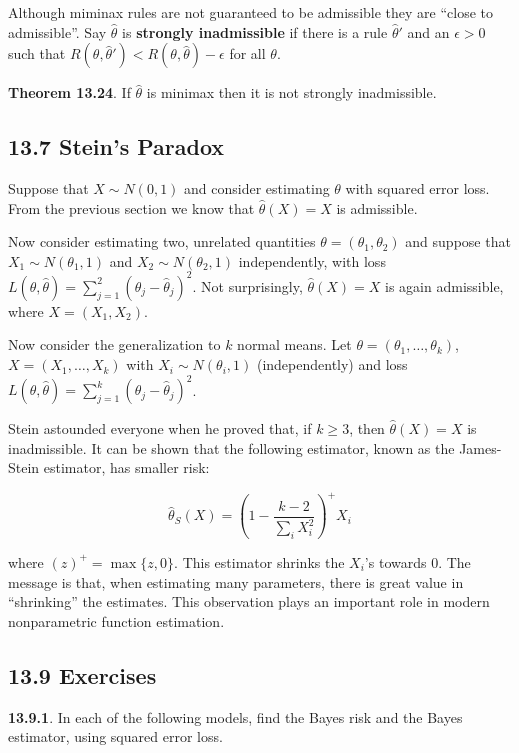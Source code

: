 Although miminax rules are not guaranteed to be admissible they are
``close to admissible''. Say \(\hat{\theta}\) is \textbf{strongly
inadmissible} if there is a rule \(\hat{\theta}'\) and an
\(\epsilon > 0\) such that
\(R(\theta, \hat{\theta}') < R(\theta, \hat{\theta}) - \epsilon\) for
all \(\theta\).

\textbf{Theorem 13.24}. If \(\hat{\theta}\) is minimax then it is not
strongly inadmissible.

\subsection{13.7 Stein's Paradox}\label{steins-paradox}

Suppose that \(X \sim N(0, 1)\) and consider estimating \(\theta\) with
squared error loss. From the previous section we know that
\(\hat{\theta}(X) = X\) is admissible.

Now consider estimating two, unrelated quantities
\(\theta = (\theta_1, \theta_2)\) and suppose that
\(X_1 \sim N(\theta_1, 1)\) and \(X_2 \sim N(\theta_2, 1)\)
independently, with loss
\(L(\theta, \hat{\theta}) = \sum_{j=1}^2 (\theta_j - \hat{\theta}_j)^2\).
Not surprisingly, \(\hat{\theta}(X) = X\) is again admissible, where
\(X = (X_1, X_2)\).

Now consider the generalization to \(k\) normal means. Let
\(\theta = (\theta_1, \dots, \theta_k)\), \(X = (X_1, \dots, X_k)\) with
\(X_i \sim N(\theta_i, 1)\) (independently) and loss
\(L(\theta, \hat{\theta}) = \sum_{j=1}^k (\theta_j - \hat{\theta}_j)^2\).

Stein astounded everyone when he proved that, if \(k \geq 3\), then
\(\hat{\theta}(X) = X\) is inadmissible. It can be shown that the
following estimator, known as the James-Stein estimator, has smaller
risk:

\[\hat{\theta}_S(X) = \left(1 - \frac{k-2}{\sum_i X_i^2} \right)^+ X_i\]

where \((z)^+ = \max \{z, 0\}\). This estimator shrinks the \(X_i\)'s
towards 0. The message is that, when estimating many parameters, there
is great value in ``shrinking'' the estimates. This observation plays an
important role in modern nonparametric function estimation.

\subsection{13.9 Exercises}\label{exercises}

\textbf{13.9.1}. In each of the following models, find the Bayes risk
and the Bayes estimator, using squared error loss.

